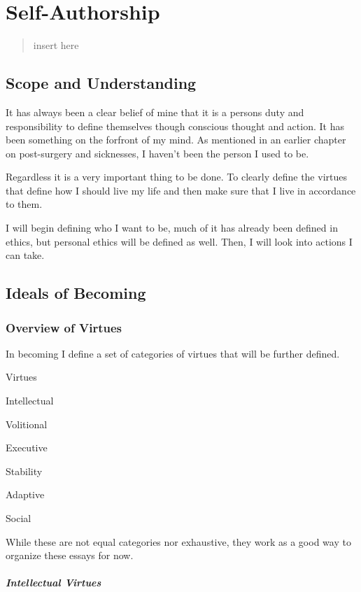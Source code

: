 \chapter{Self-Authorship}
\begin{quote}
insert here
\end{quote}

\section{Scope and Understanding}

It has always been a clear belief of mine that it is a persons duty and responsibility to define themselves though conscious thought and action.
It has been something on the forfront of my mind. As mentioned in an earlier chapter on post-surgery and sicknesses, I haven't been the person I
used to be.

Regardless it is a very important thing to be done. To clearly define the virtues that define how I should live my life and then make sure
that I live in accordance to them.

I will begin defining who I want to be, much of it has already been defined in ethics, but personal ethics will be defined as well. Then, I will look
into actions I can take.

\section{Ideals of Becoming}

\subsection{Overview of Virtues}
In becoming I define a set of categories of virtues that will be further defined.
\begin{list}{Virtues}{}
    \item Intellectual
    \item Volitional
    \item Executive
    \item Stability
    \item Adaptive
    \item Social
\end{list}
While these are not equal categories nor exhaustive, they work as a good way to organize these essays for now.

\paragraph{Intellectual Virtues}

